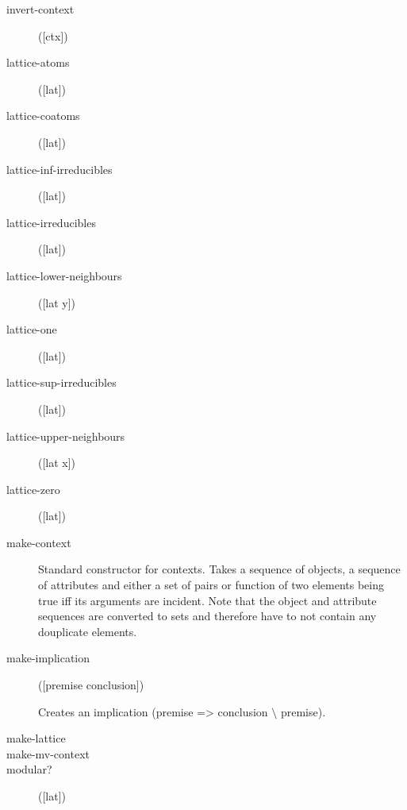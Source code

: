 \begin{description}
  \item[invert-context]
([ctx])



  \item[lattice-atoms]
([lat])



  \item[lattice-coatoms]
([lat])



  \item[lattice-inf-irreducibles]
([lat])



  \item[lattice-irreducibles]
([lat])



  \item[lattice-lower-neighbours]
([lat y])



  \item[lattice-one]
([lat])



  \item[lattice-sup-irreducibles]
([lat])



  \item[lattice-upper-neighbours]
([lat x])



  \item[lattice-zero]
([lat])



  \item[make-context]


Standard constructor for contexts. Takes a sequence of objects,
  a sequence of attributes and either a set of pairs or function of
  two elements being true iff its arguments are incident. Note that the
  object and attribute sequences are converted to sets and therefore have to
  not contain any douplicate elements.

  \item[make-implication]
([premise conclusion])

Creates an implication (premise => conclusion $\setminus$ premise).

  \item[make-lattice]




  \item[make-mv-context]




  \item[modular?]
([lat])




\end{description}
